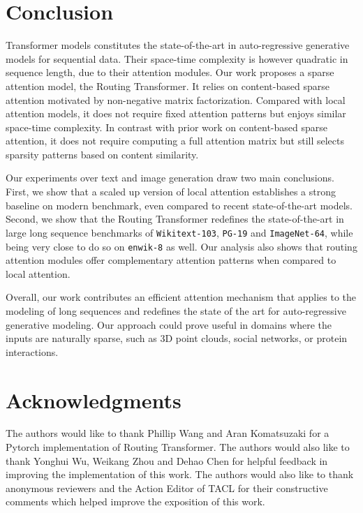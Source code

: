 \documentclass[a4paper]{article}
\begin{document}
\section{Conclusion}
Transformer models constitutes the state-of-the-art in auto-regressive generative models
for sequential data. Their space-time complexity is however quadratic in sequence length, due to their attention modules. Our work proposes a sparse 
attention model, 
the Routing Transformer. It relies on content-based sparse attention motivated by non-negative matrix factorization. Compared with local attention 
models, it does not 
require fixed attention patterns but enjoys similar space-time complexity. In contrast with prior work on content-based sparse attention, it does not 
require computing 
a full attention matrix but still selects sparsity patterns based on content similarity.

Our experiments over text and image generation draw two main conclusions. First, we show that a scaled up version of local attention establishes a 
strong baseline on  
modern benchmark, even compared to recent state-of-the-art models. Second, we show that the 
Routing Transformer redefines 
the state-of-the-art in large long sequence
benchmarks of
\texttt{Wikitext-103}, \texttt{PG-19} and \texttt{ImageNet-64}, while being very close to do so on 
\texttt{enwik-8} as well.
Our analysis also shows that routing attention modules offer complementary attention patterns when compared to local attention.

Overall, our work contributes an efficient attention mechanism that 
applies to the modeling of long sequences and redefines the state of the art for
auto-regressive generative modeling. Our approach could prove useful in domains where the inputs are naturally
sparse, such as 3D point clouds, social 
networks, or protein interactions. 

\section{Acknowledgments}
The authors would like to thank Phillip Wang and Aran Komatsuzaki for a Pytorch implementation of Routing Transformer. The authors would also like to thank Yonghui Wu, Weikang Zhou and 
Dehao Chen for helpful feedback in improving the implementation of this work. The authors 
would also like to thank anonymous reviewers and the Action Editor of TACL 
for their constructive comments which helped improve the exposition of this work. 



\appendix
\end{document}
